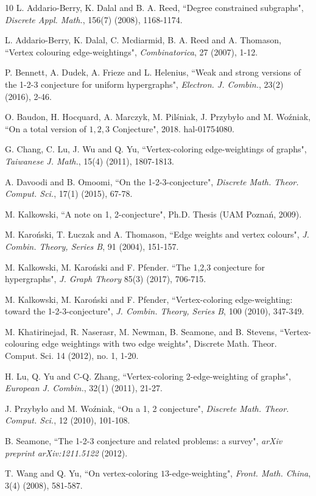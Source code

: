 \documentclass[12pt,a4paper]{article}
\begin{document}
\begin{thebibliography}{10}
	L. Addario-Berry, K. Dalal and B. A. Reed, ``Degree constrained subgraphs",  \textit{Discrete Appl. Math.}, 156(7) (2008), 1168-1174.
	
	L. Addario-Berry, K. Dalal, C. Mcdiarmid, B. A. Reed and A. Thomason, ``Vertex colouring
	edge-weightings", \textit{Combinatorica}, 27 (2007), 1-12.
	
	P. Bennett, A. Dudek, A. Frieze  and L. Helenius, ``Weak and strong versions of the 1-2-3 conjecture for uniform hypergraphs",  \textit{Electron. J. Combin.}, 23(2) (2016),  2-46.
		
	O. Baudon, H. Hocquard, A. Marczyk,  M. Pil\'{s}niak, J. Przyby\l o and M. Wo\'{z}niak, ``On a total version of $1,2,3$ Conjecture", 2018. hal-01754080.
	
	G. Chang, C. Lu, J. Wu and Q. Yu, ``Vertex-coloring
	edge-weightings of graphs", \textit{Taiwanese
		J. Math.}, 15(4) (2011), 1807-1813.
	
	A. Davoodi and B. Omoomi, ``On the 1-2-3-conjecture", \textit{Discrete Math. Theor. Comput. Sci.}, 17(1) (2015), 67-78.

	M. Kalkowski, ``A note on 1, 2-conjecture",  Ph.D. Thesis (UAM Pozna\'{n}, 2009).
	
	M. Karo\'{n}ski, T. \L uczak and A. Thomason, ``Edge weights and vertex colours", \textit{J.
		Combin. Theory, Series B}, 91 (2004), 151-157.
	
	M. Kalkowski,  M. Karo\'nski and F. Pfender. ``The  1,2,3 conjecture  for  hypergraphs", \textit{J. Graph Theory} 85(3) (2017), 706-715.
	
	M. Kalkowski, M. Karo\'nski and F. Pfender, ``Vertex-coloring edge-weighting: toward
	the 1-2-3-conjecture", \textit{J. Combin. Theory, Series B}, 100 (2010), 347-349.
	
	M. Khatirinejad, R. Naserasr, M. Newman, B. Seamone, and B. Stevens, ``Vertex-colouring edge weightings with two edge weights", Discrete Math. Theor. Comput. Sci. 14 (2012), no. 1, 1-20.
	
	H. Lu, Q. Yu  and C-Q. Zhang,  ``Vertex-coloring 2-edge-weighting of graphs", \textit{European J. Combin.}, 32(1) (2011), 21-27.
	
	J. Przyby\l o and M. Wo\'{z}niak, ``On a 1, 2 conjecture", \textit{Discrete Math. Theor. Comput.
		Sci.}, 12 (2010), 101-108.
	
	B. Seamone, ``The 1-2-3 conjecture and related problems: a survey", \textit{arXiv preprint arXiv:1211.5122} (2012).
		
	T. Wang and Q. Yu, ``On vertex-coloring $13$-edge-weighting", \textit{Front. Math. China}, 3(4) (2008), 581-587.
	
\end{thebibliography}
\end{document}
